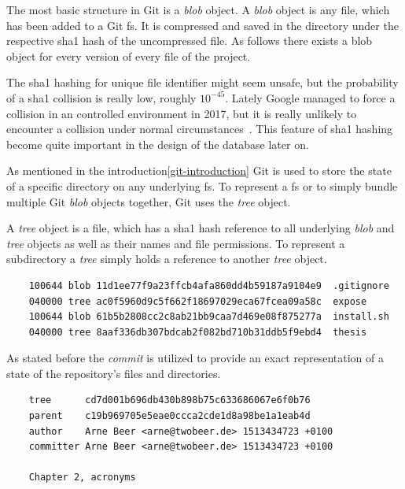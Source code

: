 The most basic structure in Git is a \emph{blob} object.
A \emph{blob} object is any file, which has been added to a Git \ac{fs}.
It is compressed and saved in the  directory under the respective \ac{sha1} hash of the uncompressed file.
As follows there exists a blob object for every version of every file of the project.

The \ac{sha1} hashing for unique file identifier might seem unsafe, but the probability of a \ac{sha1} collision is really low, roughly $10^{-45}$.
Lately Google managed to force a collision in an controlled environment in 2017, but it is really unlikely to encounter a collision under normal circumstances~\cite{techreport:sha-collision}.
This feature of \ac{sha1} hashing become quite important in the design of the database later on.

As mentioned in the introduction\ref{git-introduction} Git is used to store the state of a specific directory on any underlying \ac{fs}.
To represent a \ac{fs} or to simply bundle multiple Git \emph{blob} objects together, Git uses the \emph{tree} object.

A \emph{tree} object is a file, which has a \ac{sha1} hash reference to all underlying \emph{blob} and \emph{tree} objects as well as their names and file permissions.
To represent a subdirectory a \emph{tree} simply holds a reference to another \emph{tree} object.

\begin{verbatim}
    100644 blob 11d1ee77f9a23ffcb4afa860dd4b59187a9104e9  .gitignore
    040000 tree ac0f5960d9c5f662f18697029eca67fcea09a58c  expose
    100644 blob 61b5b2808cc2c8ab21bb9caa7d469e08f875277a  install.sh
    040000 tree 8aaf336db307bdcab2f082bd710b31ddb5f9ebd4  thesis
\end{verbatim}
\begingroup
{}
\endgroup

As stated before the \emph{commit} is utilized to provide an exact representation of a state of the repository's files and directories.

\begin{verbatim}
    tree      cd7d001b696db430b898b75c633686067e6f0b76
    parent    c19b969705e5eae0ccca2cde1d8a98be1a1eab4d
    author    Arne Beer <arne@twobeer.de> 1513434723 +0100
    committer Arne Beer <arne@twobeer.de> 1513434723 +0100

    Chapter 2, acronyms
\end{verbatim}
\begingroup
{}
\endgroup

